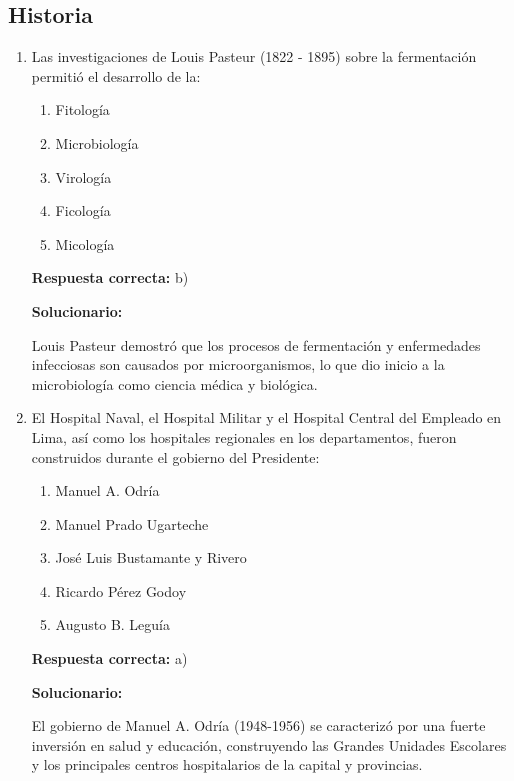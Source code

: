 \subsection*{Historia}

\begin{enumerate}[resume]

	\item Las investigaciones de Louis Pasteur (1822 - 1895) sobre la fermentación permitió el desarrollo de la:
	\begin{enumerate}[label=\alph*)]
		\item Fitología
		\item Microbiología
		\item Virología
		\item Ficología
		\item Micología
	\end{enumerate}
	\textbf{Respuesta correcta:} b)

	\vspace{2mm}
	\textbf{Solucionario:}

	Louis Pasteur demostró que los procesos de fermentación y enfermedades infecciosas son causados por microorganismos, lo que dio inicio a la microbiología como ciencia médica y biológica.

	\vspace{6mm}

	\item El Hospital Naval, el Hospital Militar y el Hospital Central del Empleado en Lima, así como los hospitales regionales en los departamentos, fueron construidos durante el gobierno del Presidente:
	\begin{enumerate}[label=\alph*)]
		\item Manuel A. Odría
		\item Manuel Prado Ugarteche
		\item José Luis Bustamante y Rivero
		\item Ricardo Pérez Godoy
		\item Augusto B. Leguía
	\end{enumerate}
	\textbf{Respuesta correcta:} a)

	\vspace{2mm}
	\textbf{Solucionario:}

	El gobierno de Manuel A. Odría (1948-1956) se caracterizó por una fuerte inversión en salud y educación, construyendo las Grandes Unidades Escolares y los principales centros hospitalarios de la capital y provincias.

	\vspace{6mm}

\end{enumerate}


